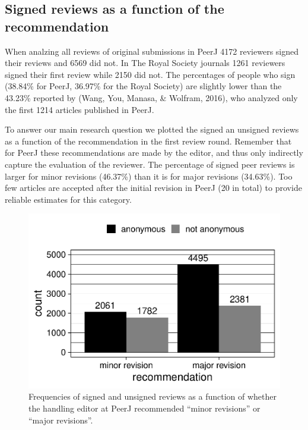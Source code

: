 \documentclass[,jou, a4paper,floatsintext]{apa6}
\begin{document}
\hypertarget{signed-reviews-as-a-function-of-the-recommendation}{%
\subsection{Signed reviews as a function of the recommendation}\label{signed-reviews-as-a-function-of-the-recommendation}}

When analzing all reviews of original submissions in PeerJ 4172 reviewers signed their reviews and 6569 did not. In The Royal Society journals 1261 reviewers signed their first review while 2150 did not. The percentages of people who sign (38.84\% for PeerJ, 36.97\% for the Royal Society) are slightly lower than the 43.23\% reported by (Wang, You, Manasa, \& Wolfram, 2016), who analyzed only the first 1214 articles published in PeerJ.

To answer our main research question we plotted the signed an unsigned reviews as a function of the recommendation in the first review round. Remember that for PeerJ these recommendations are made by the editor, and thus only indirectly capture the evaluation of the reviewer. The percentage of signed peer reviews is larger for minor revisions (46.37\%) than it is for major revisions (34.63\%). Too few articles are accepted after the initial revision in PeerJ (20 in total) to provide reliable estimates for this category.

\begin{figure}
\centering
\includegraphics{open_peer_review_files/figure-latex/PeerJrec-1.pdf}
\caption{\label{fig:PeerJrec}Frequencies of signed and unsigned reviews as a function of whether the handling editor at PeerJ recommended \enquote{minor revisions} or \enquote{major revisions}.}
\end{figure}
\end{document}
